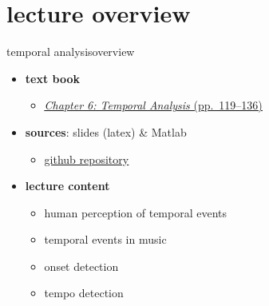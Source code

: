 

\subtitle{Part 7.1: Temporal Analysis}


	

    \section[overview]{lecture overview}
        \begin{frame}{temporal analysis}{overview}
            \begin{itemize}
                \item   \textbf{text book}  
                    \begin{itemize}
                        \item   \href{http://ieeexplore.ieee.org/xpl/articleDetails.jsp?tp=&arnumber=6331123&}{\underline{\textit{Chapter 6: Temporal Analysis} (pp.~119--136)}}
                    \end{itemize}
                \item   \textbf{sources}: slides (latex) \& Matlab  
                    \begin{itemize}
                        \item   \href{https://github.com/alexanderlerch/ACA-Slides}{\underline{github repository}}
                    \end{itemize}
                \bigskip
                \item<2->   \textbf{lecture content}
                    \begin{itemize}
                        \item<2->   human perception of temporal events
                        \item<3->   temporal events in music
                        \item<4->   onset detection
                        \item<5->   tempo detection
                    \end{itemize}
            \end{itemize}
        \end{frame}

